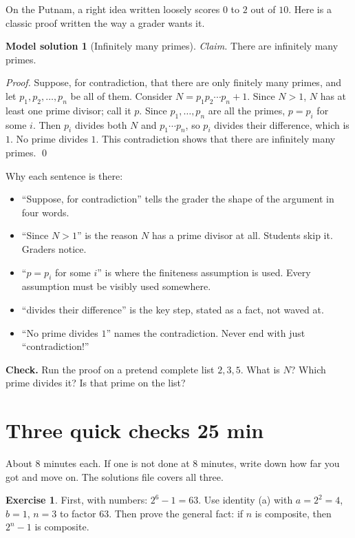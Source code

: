 \documentclass[11pt]{article}
\theoremstyle{plain}
\theoremstyle{definition}
\newtheorem{example}{Model solution}
\newtheorem{exercise}{Exercise}
\begin{document}
On the Putnam, a right idea written loosely scores $0$ to $2$ out of $10$. Here is a classic proof written the way a grader wants it.

\begin{example}[Infinitely many primes]
\textit{Claim.} There are infinitely many primes.

\textit{Proof.} Suppose, for contradiction, that there are only finitely many primes, and let $p_1, p_2, \dots, p_n$ be all of them. Consider $N = p_1 p_2 \cdots p_n + 1$. Since $N > 1$, $N$ has at least one prime divisor; call it $p$. Since $p_1, \dots, p_n$ are all the primes, $p = p_i$ for some $i$. Then $p_i$ divides both $N$ and $p_1 \cdots p_n$, so $p_i$ divides their difference, which is $1$. No prime divides $1$. This contradiction shows that there are infinitely many primes. \qed
\end{example}

Why each sentence is there:
\begin{itemize}
  \item ``Suppose, for contradiction'' tells the grader the shape of the argument in four words.
  \item ``Since $N > 1$'' is the reason $N$ has a prime divisor at all. Students skip it. Graders notice.
  \item ``$p = p_i$ for some $i$'' is where the finiteness assumption is used. Every assumption must be visibly used somewhere.
  \item ``divides their difference'' is the key step, stated as a fact, not waved at.
  \item ``No prime divides $1$'' names the contradiction. Never end with just ``contradiction!''
\end{itemize}

\noindent\textbf{Check.} Run the proof on a pretend complete list $2, 3, 5$. What is $N$? Which prime divides it? Is that prime on the list?

\section{Three quick checks \hfill 25 min}

About 8 minutes each. If one is not done at 8 minutes, write down how far you got and move on. The solutions file covers all three.

\begin{exercise}
First, with numbers: $2^6 - 1 = 63$. Use identity (a) with $a = 2^2 = 4$, $b = 1$, $n = 3$ to factor $63$. Then prove the general fact: if $n$ is composite, then $2^n - 1$ is composite.
\end{exercise}
\end{document}
